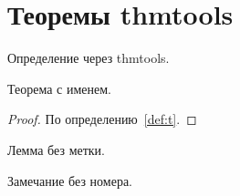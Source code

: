 \documentclass[12pt]{article}
\begin{document}
\section{Теоремы thmtools}

\begin{definition}\label{def:t}
Определение через thmtools.
\end{definition}

\begin{theorem}[Главная]\label{thm:t}
Теорема с именем.
\end{theorem}

\begin{proof}
По определению~\ref{def:t}.
\end{proof}

\begin{lemma}
Лемма без метки.
\end{lemma}

\begin{remark}
Замечание без номера.
\end{remark}
\end{document}
